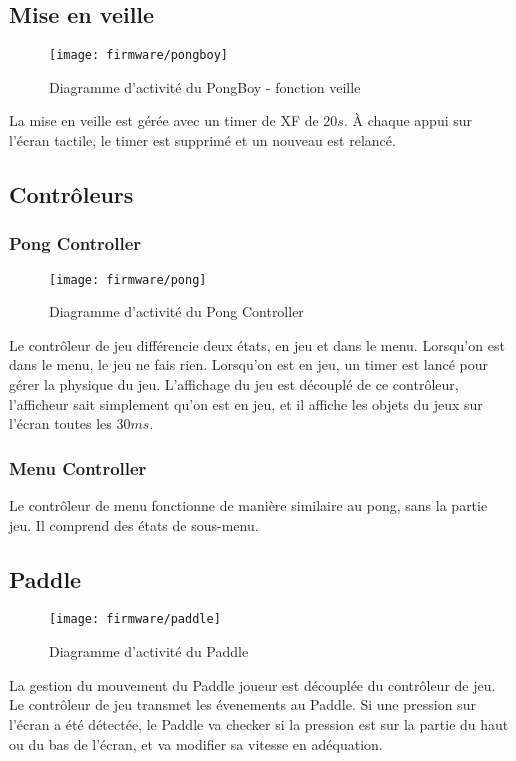 \subsection{Mise en veille}
\begin{figure}[H]
  \centering
  \texttt{[image: firmware/pongboy]}
  \caption{Diagramme d'activité du PongBoy - fonction veille}
  \label{firm_sleep}
\end{figure}
La mise en veille est gérée avec un timer de XF de $20s$. À chaque
appui sur l'écran tactile, le timer est supprimé et un nouveau est relancé.
\newpage

\subsection{Contrôleurs}
\subsubsection{Pong Controller}
\begin{figure}[H]
  \centering
  \texttt{[image: firmware/pong]}
  \caption{Diagramme d'activité du Pong Controller}
  \label{firm_pong}
\end{figure}
Le contrôleur de jeu différencie deux états, en jeu et dans le menu.
Lorsqu'on est dans le menu, le jeu ne fais rien.
Lorsqu'on est en jeu, un timer est lancé pour gérer la physique du jeu.
L'affichage du jeu est découplé de ce contrôleur, l'afficheur sait simplement
qu'on est en jeu, et il affiche les objets du jeux sur l'écran toutes les $30ms$.

\subsubsection{Menu Controller}
Le contrôleur de menu fonctionne de manière similaire au pong, sans la partie
jeu. Il comprend des états de sous-menu.
\newpage

\subsection{Paddle}
\begin{figure}[H]
  \centering
  \texttt{[image: firmware/paddle]}
  \caption{Diagramme d'activité du Paddle}
  \label{firm_paddle}
\end{figure}
La gestion du mouvement du Paddle joueur est découplée du contrôleur de jeu.
Le contrôleur de jeu transmet les évenements au Paddle.
Si une pression sur l'écran a été détectée, le Paddle va checker si la pression
est sur la partie du haut ou du bas de l'écran, et va modifier sa vitesse
en adéquation.
